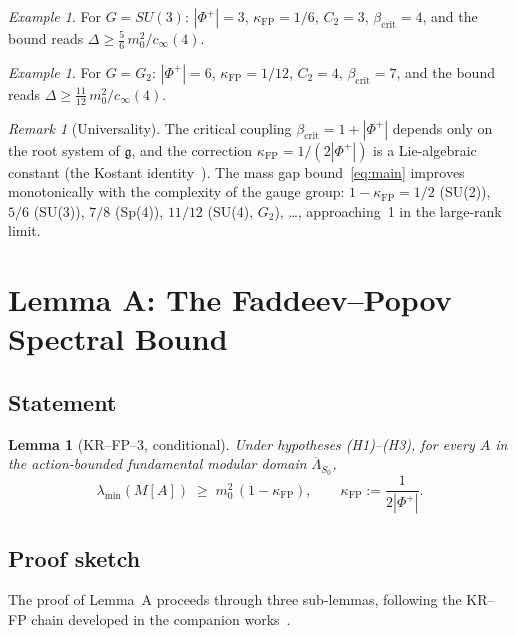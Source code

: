 \documentclass[11pt,a4paper]{amsart}
\newtheorem{lemma}[theorem]{Lemma}
\theoremstyle{definition}
\theoremstyle{remark}
\newtheorem{remark}[theorem]{Remark}
\newtheorem{example}[theorem]{Example}
\newcommand{\gfrak}{\mathfrak{g}}
\newcommand{\kFP}{\kappa_{\mathrm{FP}}}
\newcommand{\PhiPlus}{\Phi^+}
\newcommand{\cinf}{c_{\infty}}
\newcommand{\betacrit}{\beta_{\mathrm{crit}}}
\begin{document}
\begin{example}
For $G = SU(3)$: $|\PhiPlus| = 3$, $\kFP = 1/6$,
$C_2 = 3$, $\betacrit = 4$, and the bound reads
$\Delta \geq \frac{5}{6}\,m_0^2/\cinf(4)$.
\end{example}

\begin{example}
For $G = G_2$: $|\PhiPlus| = 6$, $\kFP = 1/12$,
$C_2 = 4$, $\betacrit = 7$, and the bound reads
$\Delta \geq \frac{11}{12}\,m_0^2/\cinf(4)$.
\end{example}

\begin{remark}[Universality]
The critical coupling $\betacrit = 1 + |\PhiPlus|$ depends only on the root
system of $\gfrak$, and the correction $\kFP = 1/(2|\PhiPlus|)$ is a
Lie-algebraic constant (the Kostant identity~\cite{Kostant1959}).
The mass gap bound~\eqref{eq:main} improves monotonically with the
complexity of the gauge group:
$1 - \kFP = 1/2$ (SU(2)), $5/6$ (SU(3)), $7/8$ (Sp(4)),
$11/12$ (SU(4), $G_2$), \ldots, approaching~1 in the large-rank limit.
\end{remark}

\section{Lemma A: The Faddeev--Popov Spectral Bound}\label{sec:lemmaA}

\subsection{Statement}

\begin{lemma}[KR--FP--3, conditional]\label{lem:A}
Under hypotheses \textnormal{(H1)--(H3)}, for every $A$ in the action-bounded
fundamental modular domain $\overline{\Lambda}_{S_0}$,
\begin{equation}\label{eq:FP-bound}
\lambda_{\min}(M[A]) \;\geq\; m_0^2\,(1 - \kFP),
\qquad \kFP := \frac{1}{2|\PhiPlus|}.
\end{equation}
\end{lemma}

\subsection{Proof sketch}

The proof of Lemma~A proceeds through three sub-lemmas, following the
KR--FP chain developed in the companion works~\cite{RemondiereKRFP3, RemondiereFPHess}.
\end{document}
